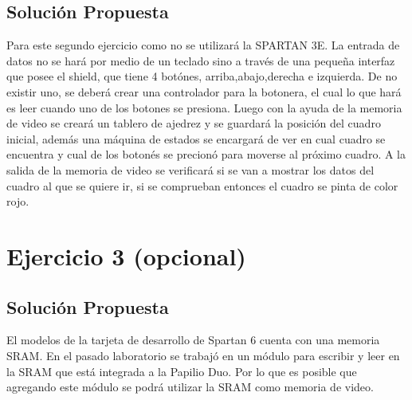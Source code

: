 \documentclass[10pt]{article}
\begin{document}
\subsection*{Solución Propuesta}
Para este segundo ejercicio como no se utilizará la SPARTAN 3E. La entrada de datos no se hará por medio de un teclado sino a través de una pequeña interfaz que posee el shield, que tiene 4 botónes, arriba,abajo,derecha e izquierda.
De no existir uno, se deberá crear una controlador para la botonera, el cual lo que hará es leer cuando uno de los botones se presiona.
Luego con la ayuda de la memoria de video se creará un tablero de ajedrez y se guardará la posición del cuadro inicial, además una máquina de estados se encargará de ver en cual cuadro se encuentra y cual de los botonés se precionó para moverse al próximo cuadro. A la salida de la memoria de video se verificará si se van a mostrar los datos del cuadro al que se quiere ir, si se comprueban entonces el cuadro se pinta de color rojo.

\section*{Ejercicio 3 (opcional)}
\subsection*{Solución Propuesta}
El modelos de la tarjeta de desarrollo de Spartan 6 cuenta con una memoria SRAM. En el pasado laboratorio se trabajó en un módulo para escribir y leer en la SRAM que está integrada a la Papilio Duo. Por lo que es posible que agregando este módulo se podrá utilizar la SRAM como memoria de video.
\end{document}
